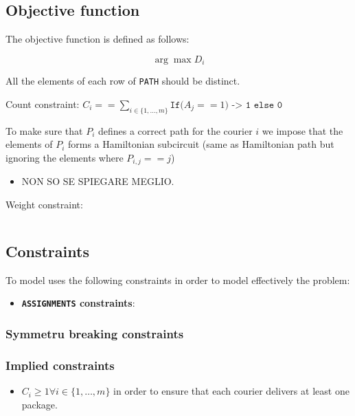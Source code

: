 \subsection{Objective function}
The objective function is defined as follows:

\[ \arg \max D_i  \]
    \item All the elements of each row of \texttt{PATH} should be distinct.

    \item Count constraint: $C_i == \sum_{i \in \{1, \dots, m\}} \texttt{If(} A_j == 1 \texttt{) -> 1 else 0}$

    \item To make sure that $P_i$ defines a correct path for the courier $i$ we impose that the elements of $P_i$ forms a Hamiltonian subcircuit (same as Hamiltonian path but ignoring the elements where $P_{i,j} == j$)

    \begin{itemize}
        \item NON SO SE SPIEGARE MEGLIO.
    \end{itemize}

    \item Weight constraint: 
        
\[\]


\subsection{Constraints}
To model uses the following constraints in order to model effectively the problem:

\begin{itemize}
    \item \textbf{\texttt{ASSIGNMENTS} constraints}: 
\end{itemize}

\subsubsection{Symmetru breaking constraints}

\subsubsection{Implied constraints}

\begin{itemize}
    \item $C_i \geq 1 \forall i \in \{1, \dots, m\}$ in order to ensure that each courier delivers at least one package.
\end{itemize}


